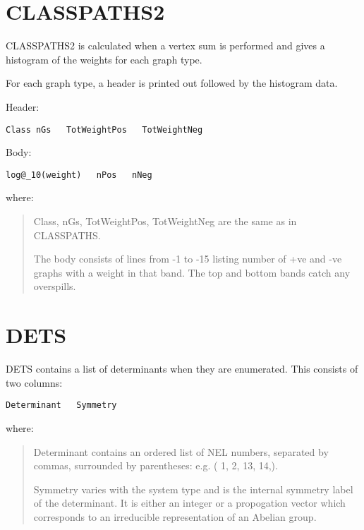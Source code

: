 \documentclass[openany,a4paper,10pt,english]{manual}
\begin{document}
\resetcurrentobjects
\hypertarget{--doc-output/classpaths2}{}

\hypertarget{output-classpaths2}{}\section{CLASSPATHS2}

CLASSPATHS2 is calculated when a vertex sum is performed and gives a histogram of the weights for each graph type.

For each graph type, a header is printed out followed by the histogram data.

Header:

\begin{Verbatim}[commandchars=@\[\]]
Class nGs   TotWeightPos   TotWeightNeg
\end{Verbatim}

Body:

\begin{Verbatim}[commandchars=@\[\]]
log@_10(weight)   nPos   nNeg
\end{Verbatim}

where:
\begin{quote}

Class, nGs, TotWeightPos, TotWeightNeg are the same as in CLASSPATHS.

The body consists of lines from -1 to -15 listing number of +ve and -ve graphs
with a weight in that band.  The top and bottom bands catch any overspills.
\end{quote}

\resetcurrentobjects
\hypertarget{--doc-output/dets}{}

\hypertarget{output-dets}{}\section{DETS}

DETS contains a list of determinants when they are enumerated.  This consists of two columns:

\begin{Verbatim}[commandchars=@\[\]]
Determinant   Symmetry
\end{Verbatim}

where:
\begin{quote}

Determinant contains an ordered list of NEL numbers, separated by commas,
surrounded by parentheses:  e.g. (    1,    2,   13,   14,).

Symmetry varies with the system type and is the internal symmetry label of the
determinant.  It is either an integer or a propogation vector which corresponds
to an irreducible representation of an Abelian group.
\end{quote}
\end{document}
